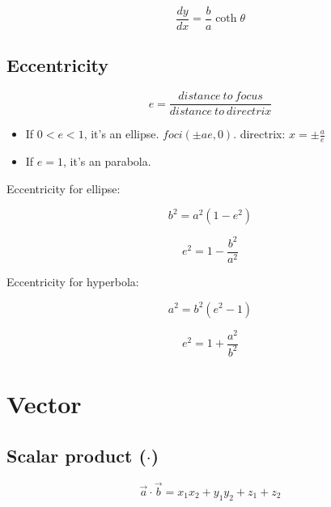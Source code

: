 \documentclass[a4paper,9pt]{scrartcl}
\begin{document}
    \begin{displaymath}
        \frac{dy}{dx} = \frac{b}{a}\coth\theta
    \end{displaymath}

    \subsection{Eccentricity}

    \begin{displaymath}
        e = \frac{distance\ to\ focus}{distance\ to\ directrix}
    \end{displaymath}

    \begin{itemize}
        \item If $0 < e < 1$, it's an ellipse.
        $foci({\pm}ae, 0)$.
        directrix: $x = \pm\frac{a}{e}$
        \item If $e = 1$, it's an parabola.
    \end{itemize}

    Eccentricity for ellipse:

    \begin{displaymath}
        b^2 = a^2(1-e^2)
    \end{displaymath}

    \begin{displaymath}
        e^2 = 1 - \frac{b^2}{a^2}
    \end{displaymath}

    Eccentricity for hyperbola:

    \begin{displaymath}
        a^2 = b^2(e^2-1)
    \end{displaymath}

    \begin{displaymath}
        e^2 = 1 + \frac{a^2}{b^2}
    \end{displaymath}


    \section{Vector}

    \newcommand{\vecabs}[1]{\left\| \vec{#1} \right\|}
    \newcommand{\abs}[1]{\left\| #1 \right\|}

    \subsection{Scalar product ($\cdot$)}
    \begin{displaymath}
        \vec{a}\cdot\vec{b}= x_1 x_2 + y_1 y_2 + z_1 + z_2
    \end{displaymath}
\end{document}
